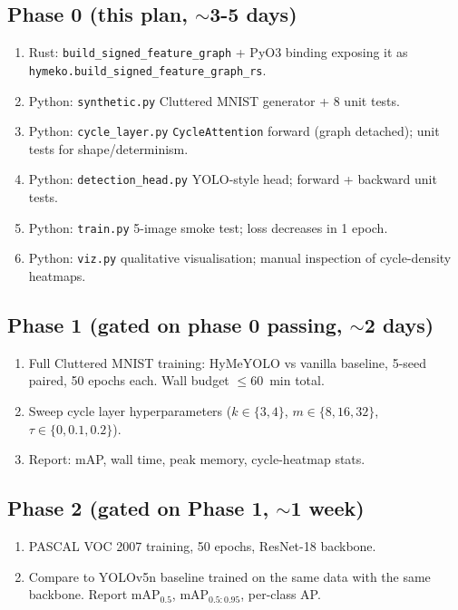 \documentclass[11pt,a4paper]{article}
\begin{document}
\subsection*{Phase 0 (this plan, $\sim$3-5 days)}
\begin{enumerate}
\item Rust: \texttt{build\_signed\_feature\_graph} + PyO3 binding
  exposing it as \texttt{hymeko.build\_signed\_feature\_graph\_rs}.
\item Python: \texttt{synthetic.py} Cluttered MNIST generator + 8
  unit tests.
\item Python: \texttt{cycle\_layer.py} \texttt{CycleAttention}
  forward (graph detached); unit tests for shape/determinism.
\item Python: \texttt{detection\_head.py} YOLO-style head;
  forward + backward unit tests.
\item Python: \texttt{train.py} 5-image smoke test; loss decreases
  in 1 epoch.
\item Python: \texttt{viz.py} qualitative visualisation; manual
  inspection of cycle-density heatmaps.
\end{enumerate}

\subsection*{Phase 1 (gated on phase 0 passing, $\sim$2 days)}
\begin{enumerate}
\item Full Cluttered MNIST training: HyMeYOLO vs vanilla baseline,
  5-seed paired, 50 epochs each.  Wall budget $\le 60$~min total.
\item Sweep cycle layer hyperparameters ($k \in \{3, 4\}$,
  $m \in \{8, 16, 32\}$, $\tau \in \{0, 0.1, 0.2\}$).
\item Report: mAP, wall time, peak memory, cycle-heatmap stats.
\end{enumerate}

\subsection*{Phase 2 (gated on Phase 1, $\sim$1 week)}
\begin{enumerate}
\item PASCAL VOC 2007 training, 50 epochs, ResNet-18 backbone.
\item Compare to YOLOv5n baseline trained on the same data with
  the same backbone.  Report mAP$_{0.5}$, mAP$_{0.5:0.95}$,
  per-class AP.
\end{enumerate}
\end{document}
